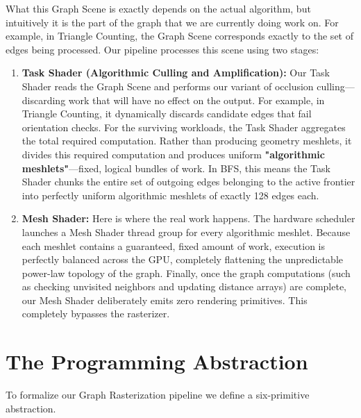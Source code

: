 \documentclass[11pt, a4paper]{article}
\begin{document}
What this Graph Scene is exactly depends on the actual algorithm, but intuitively it is the part of the graph that we are currently doing work on. For example, in Triangle Counting, the Graph Scene corresponds exactly to the set of edges being processed. Our pipeline processes this scene using two stages:

\begin{enumerate}
    \item \textbf{Task Shader (Algorithmic Culling and Amplification):} Our Task Shader reads the Graph Scene and performs our variant of occlusion culling---discarding work that will have no effect on the output. For example, in Triangle Counting, it dynamically discards candidate edges that fail orientation checks. For the surviving workloads, the Task Shader aggregates the total required computation. Rather than producing geometry meshlets, it divides this required computation and produces uniform \textbf{"algorithmic meshlets"}---fixed, logical bundles of work. In BFS, this means the Task Shader chunks the entire set of outgoing edges belonging to the active frontier into perfectly uniform algorithmic meshlets of exactly 128 edges each.
    
    \item \textbf{Mesh Shader:} Here is where the real work happens. The hardware scheduler launches a Mesh Shader thread group for every algorithmic meshlet. Because each meshlet contains a guaranteed, fixed amount of work, execution is perfectly balanced across the GPU, completely flattening the unpredictable power-law topology of the graph. Finally, once the graph computations (such as checking unvisited neighbors and updating distance arrays) are complete, our Mesh Shader deliberately emits zero rendering primitives. This completely bypasses the rasterizer.
\end{enumerate}

\section{The Programming Abstraction}

To formalize our Graph Rasterization pipeline we define a six-primitive abstraction.
\end{document}
